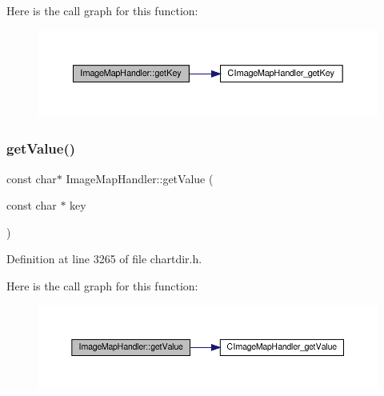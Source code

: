Here is the call graph for this function\+:
\nopagebreak
\begin{figure}[H]
\begin{center}
\leavevmode
\includegraphics[width=350pt]{class_image_map_handler_a3c7d7c5a513b5e3fe46d11e5df99f3b1_cgraph}
\end{center}
\end{figure}
\mbox{\label{class_image_map_handler_a90e325e0e5a580f816450f717796c452}} 
\subsubsection{\texorpdfstring{get\+Value()}{getValue()}\hspace{0.1cm}{\footnotesize\ttfamily [1/2]}}
{\footnotesize\ttfamily const char$\ast$ Image\+Map\+Handler\+::get\+Value (\begin{DoxyParamCaption}\item[{const char $\ast$}]{key }\end{DoxyParamCaption})\hspace{0.3cm}{\ttfamily [inline]}}



Definition at line 3265 of file chartdir.\+h.

Here is the call graph for this function\+:
\nopagebreak
\begin{figure}[H]
\begin{center}
\leavevmode
\includegraphics[width=350pt]{class_image_map_handler_a90e325e0e5a580f816450f717796c452_cgraph}
\end{center}
\end{figure}
\mbox{\label{class_image_map_handler_aea6dfdd08bc4e2fa35bda829e3984389}} 
